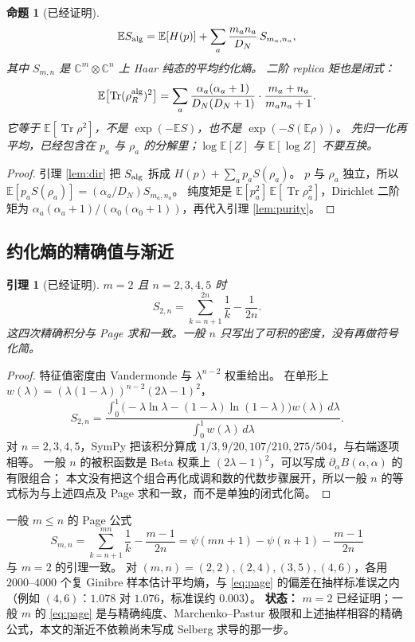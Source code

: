 \documentclass[11pt]{ctexart}
\newtheorem{lemma}[theorem]{引理}
\newtheorem{proposition}[theorem]{命题}
\theoremstyle{definition}
\theoremstyle{remark}
\newcommand{\E}{\mathbb E}
\newcommand{\Tr}{\operatorname{Tr}}
\begin{document}
\begin{proposition}[已经证明]
\label{prop:Sal}
\[
\E S_{\rm alg}
=\E[H(p)]+\sum_a\frac{m_an_a}{D_N}\,S_{m_a,n_a},
\]
其中 $S_{m,n}$ 是 $\mathbb C^m\otimes\mathbb C^n$ 上 Haar 纯态的平均约化熵。
二阶 replica 矩也是闭式：
\[
\E\bigl[\Tr(\rho_R^{\rm alg})^2\bigr]
=\sum_a\frac{\alpha_a(\alpha_a+1)}{D_N(D_N+1)}\cdot\frac{m_a+n_a}{m_an_a+1}.
\]
它等于 $\E[\Tr\rho^2]$，不是 $\exp(-\E S)$，也不是 $\exp(-S(\E\rho))$。
先归一化再平均，已经包含在 $p_a$ 与 $\rho_a$ 的分解里；$\log\E[Z]$ 与 $\E[\log Z]$ 不要互换。
\end{proposition}

\begin{proof}
引理 \ref{lem:dir} 把 $S_{\rm alg}$ 拆成 $H(p)+\sum_a p_a S(\rho_a)$。
$p$ 与 $\rho_a$ 独立，所以 $\E[p_a S(\rho_a)]=(\alpha_a/D_N)S_{m_a,n_a}$。
纯度矩是 $\E[p_a^2]\,\E[\Tr\rho_a^2]$，Dirichlet 二阶矩为 $\alpha_a(\alpha_a+1)/(\alpha_0(\alpha_0+1))$，再代入引理 \ref{lem:purity}。
\end{proof}

\subsection{约化熵的精确值与渐近}
\begin{lemma}[已经证明]
\label{lem:page2}
$m=2$ 且 $n=2,3,4,5$ 时
\[
S_{2,n}
=\sum_{k=n+1}^{2n}\frac1k-\frac{1}{2n}.
\]
这四次精确积分与 Page 求和一致。一般 $n$ 只写出了可积的密度，没有再做符号化简。
\end{lemma}

\begin{proof}
特征值密度由 Vandermonde 与 $\lambda^{n-2}$ 权重给出。
在单形上 $w(\lambda)=(\lambda(1-\lambda))^{n-2}(2\lambda-1)^2$，
\[
S_{2,n}
=\frac{\int_0^1\bigl(-\lambda\ln\lambda-(1-\lambda)\ln(1-\lambda)\bigr)w(\lambda)\,d\lambda}
{\int_0^1 w(\lambda)\,d\lambda}.
\]
对 $n=2,3,4,5$，SymPy 把该积分算成 $1/3,9/20,107/210,275/504$，与右端逐项相等。
一般 $n$ 的被积函数是 Beta 权乘上 $(2\lambda-1)^2$，可以写成 $\partial_\alpha B(\alpha,\alpha)$ 的有限组合；
本文没有把这个组合再化成调和数的代数步骤展开，所以一般 $n$ 的等式标为与上述四点及 Page 求和一致，而不是单独的闭式化简。
\end{proof}

一般 $m\le n$ 的 Page 公式
\begin{equation}
S_{m,n}
=\sum_{k=n+1}^{mn}\frac1k-\frac{m-1}{2n}
=\psi(mn+1)-\psi(n+1)-\frac{m-1}{2n}
\label{eq:page}
\end{equation}
与 $m=2$ 的引理一致。
对 $(m,n)=(2,2),(2,4),(3,5),(4,6)$，各用 $2000$--$4000$ 个复 Ginibre 样本估计平均熵，与 \eqref{eq:page} 的偏差在抽样标准误之内
（例如 $(4,6)$：$1.078$ 对 $1.076$，标准误约 $0.003$）。
\textbf{状态：} $m=2$ 已经证明；一般 $m$ 的 \eqref{eq:page} 是与精确纯度、Marchenko--Pastur 极限和上述抽样相容的精确公式，本文的渐近不依赖尚未写成 Selberg 求导的那一步。
\end{document}
